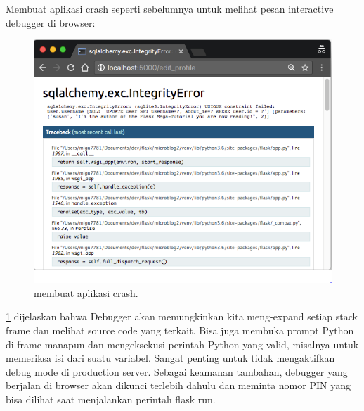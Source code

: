  Membuat aplikasi crash seperti sebelumnya untuk melihat pesan interactive debugger di browser:
 
 \begin{figure}[ht]
\centerline{\includegraphics[width=1\textwidth]{figures/5eror.PNG}}
\caption{membuat aplikasi crash.}
\label{eror}
\end{figure}
\ref{eror} dijelaskan bahwa Debugger akan memungkinkan kita meng-expand setiap stack frame dan melihat source code yang terkait. Bisa juga membuka prompt Python di frame manapun dan mengeksekusi perintah Python yang valid, misalnya untuk memeriksa isi dari suatu variabel. Sangat penting untuk tidak mengaktifkan debug mode di production server. Sebagai keamanan tambahan, debugger yang berjalan di browser akan dikunci terlebih dahulu dan meminta nomor PIN yang bisa dilihat saat menjalankan perintah flask run. 

